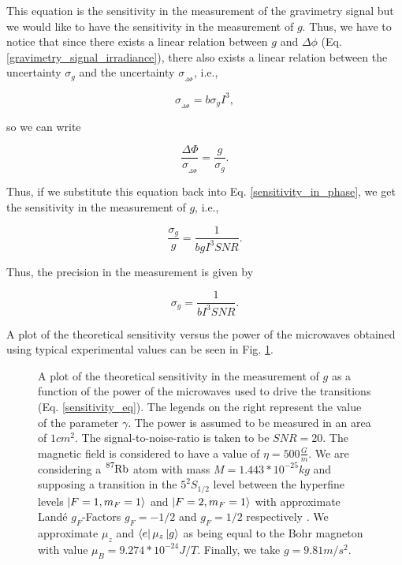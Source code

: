 \documentclass{article}
\begin{document}
This equation is the sensitivity in the measurement of the gravimetry signal but we would like to have the sensitivity in the measurement of $g$. Thus,
we have to notice that since there exists a linear relation between $g$ and $\Delta \phi$ (Eq. \ref{gravimetry_signal_irradiance}), there also exists a linear relation between the uncertainty $\sigma_{g}$ and the uncertainty $\sigma_{_{\Delta \Phi}}$, i.e.,

\begin{equation}
    \sigma_{_{\Delta \Phi}} = b \sigma_{g} I^3,
\end{equation}

so we can write 

\begin{equation}
    \frac{\Delta \Phi}{\sigma_{_{\Delta \Phi}}} = \frac{g}{\sigma_{g}}.
\end{equation}

Thus, if we substitute this equation back into Eq. \ref{sensitivity_in_phase}, we get the sensitivity in the measurement of $g$, i.e.,

\begin{equation}\label{sensitivity_eq}
    \frac{\sigma_{g}}{g} = \frac{1}{b g I^3 SNR}.
\end{equation}

Thus, the precision in the measurement is given by

\begin{equation}\label{precision_eq}
    \sigma_{g} = \frac{1}{b I^3 SNR}.
\end{equation}

A plot of the theoretical sensitivity versus the power of the microwaves obtained using typical experimental values can be seen in Fig. \ref{precision_vs_power_figure}.

\begin{figure}
    \centering
    
    \caption{A plot of the theoretical sensitivity in the measurement of $g$ as a function of the power of the microwaves used to drive the transitions (Eq. \ref{sensitivity_eq}). The legends on the right represent the value of the parameter $\gamma$. The power is assumed to be measured in an area of $1cm^2$. The signal-to-noise-ratio is taken to be $SNR=20$. The magnetic field is considered to have a value of $\eta = 500 \frac{G}{m}$. We are considering a $\ce{^{87}_{}Rb}$ atom with mass $M=1.443*10^{-25}kg$ and supposing a transition in the $5^{2}S_{1/2}$ level between the hyperfine levels $\ket{F=1, m_{F}=1}$ and $\ket{F=2, m_{F}=1}$ with approximate Landé $g_{F}$-Factors $g_{F}=-1/2$ and $g_{F}=1/2$ respectively \cite{Steck2010}. We approximate $\mu_{z}$ and $\bra{e} \mu_{z} \ket{g}$ as being equal to the Bohr magneton with value $\mu_{B}=9.274*10^{-24}J/T$. Finally, we take $g=9.81 m/s^2$.}
    \label{precision_vs_power_figure}
\end{figure}
\end{document}
